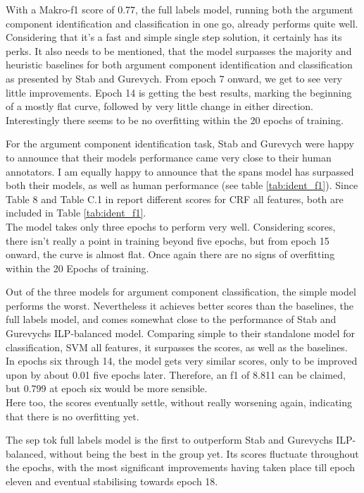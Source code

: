 \documentclass[12]{article}
\theoremstyle{mytheoremstyle}
\theoremstyle{mytheoremstyle}
\theoremstyle{myproblemstyle}
\begin{document}
  With a Makro-f1 score of 0.77, the full labels model, running both the argument component identification and classification in one go, already performs quite well. 
  Considering that it's a fast and simple single step solution, it certainly has its perks. 
  It also needs to be mentioned, that the model surpasses the majority and heuristic baselines for both argument component identification and classification as presented by Stab and Gurevych.
  From epoch 7 onward, we get to see very little improvements. 
  Epoch 14 is getting the best results, marking the beginning of a mostly flat curve, followed by very little change in either direction. 
  Interestingly there seems to be no overfitting within the 20 epochs of training.

  For the argument component identification task, Stab and Gurevych were happy to announce that their models performance came very close to their human annotators. 
  I am equally happy to announce that the spans model has surpassed both their models, as well as human performance (see table \ref{tab:ident_f1}). 
  Since Table 8 and Table C.1 in \cite{stab-gurevych-2017-parsing} report different scores for CRF all features, both are included in Table \ref{tab:ident_f1}.\\
  The model takes only three epochs to perform very well. 
  Considering scores, there isn't really a point in training beyond five epochs, but from epoch 15 onward, the curve is almost flat. 
  Once again there are no signs of overfitting within the 20 Epochs of training. 

  Out of the three models for argument component classification, the simple model performs the worst. 
  Nevertheless it achieves better scores than the baselines, the full labels model, and comes somewhat close to the performance of Stab and Gurevychs ILP-balanced model. 
  Comparing simple to their standalone model for classification, SVM all features, it surpasses the scores, as well as the baselines.\\
  In epochs six through 14, the model gets very similar scores, only to be improved upon by about 0.01 five epochs later. 
  Therefore, an f1 of 8.811 can be claimed, but 0.799 at epoch six would be more sensible.\\
  Here too, the scores eventually settle, without really worsening again, indicating that there is no overfitting yet.

  The sep tok full labels model is the first to outperform Stab and Gurevychs ILP-balanced, without being the best in the group yet. 
  Its scores fluctuate throughout the epochs, with the most significant improvements having taken place till epoch eleven and eventual stabilising towards epoch 18.
\end{document}
